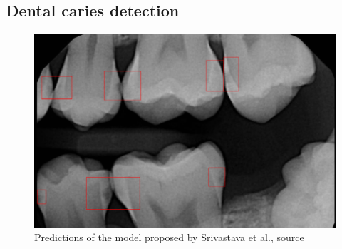 \subsection{Dental caries detection}
\begin{figure}
    \centering
    \includegraphics[width=\linewidth]{images/sirvastava_pred.png}
    \caption{Predictions of the model proposed by Srivastava et al., source \cite{Srivastava2017}}
    \label{fig:srivastava_preds}
\end{figure}
